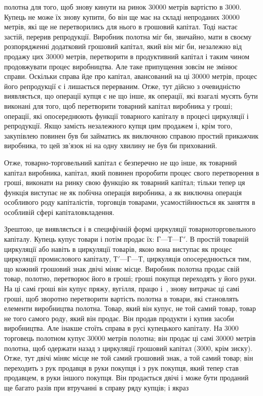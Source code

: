 \parcont{}  %
полотна для того, щоб знову кинути на ринок \num{30000} метрів вартістю в 3000. Купець
не може їх знову купити, бо він ще має на складі непроданих \num{30000} метрів, які ще
не перетворились для нього в грошовий капітал. Тоді настає
застій, перерив репродукції. Виробник полотна міг би, звичайно,
мати в своєму розпорядженні додатковий грошовий капітал, який
він міг би, незалежно від продажу цих \num{30000} метрів, перетворити
в продуктивний капітал і таким чином продовжувати процес
виробництва. Але таке припущення зовсім не змінює справи.
Оскільки справа йде про капітал, авансований на ці \num{30000} метрів,
процес його репродукції є і лишається перерваним. Отже, тут
дійсно з очевидністю виявляється, що операції купця є не що
інше, як операції, які взагалі мусять бути виконані для того, щоб
перетворити товарний капітал виробника у гроші; операції, які
опосереднюють функції товарного капіталу в процесі циркуляції і репродукції. Якщо замість
незалежного купця цим продажем і, крім того, закупівлею повинен був би займатись як виключною
справою простий прикажчик виробника, то цей зв’язок ні
на одну хвилину не був би прихований.

Отже, товарно-торговельний капітал є безперечно не що
інше, як товарний капітал виробника, капітал, який повинен проробити процес свого перетворення в
гроші, виконати на ринку
свою функцію як товарний капітал; тільки тепер ця функція виступає не як побічна операція виробника,
а як виключна операція особливого роду капіталістів, торговців товарами, усамостійнюється як заняття
в особливій сфері капіталовкладення.

Зрештою, це виявляється і в специфічній формі циркуляції
товарно\dash{}торговельного капіталу. Купець купує товари і потім
продає їх: $Г — Т — Г'$. В простій товарній циркуляції або навіть
в циркуляції товарів, якою вона виступає як процес циркуляції
промислового капіталу, $Т' — Г — Т$, циркуляція опосереднюється
тим, що кожний грошовий знак двічі міняє місце. Виробник полотна продає свій товар, полотно,
перетворює його в гроші;
гроші покупця переходять у його руки. На ці самі гроші він
купує пряжу, вугілля, працю і~, знову витрачає ці самі
гроші, щоб зворотно перетворити вартість полотна в товари, які
становлять елементи виробництва полотна. Товар, який він купує, не той самий товар, товар не того
самого роду, який
він продає. Він продав продукти і купив засоби виробництва. Але
інакше стоїть справа в русі купецького капіталу. На 3000 торговець полотном купує
\num{30000} метрів полотна;
він продає ці самі \num{30000} метрів полотна, щоб одержати назад
з циркуляції грошовий капітал (3000, крім
зиску). Отже, тут двічі міняє місце не той самий грошовий знак,
а той самий товар; він переходить з рук продавця в руки покупця і з рук покупця, який тепер став
продавцем, в руки
іншого покупця. Він продається двічі і може бути проданий
ще багато разів при втручанні в справу ряду купців; і якраз
\parbreak{}  %
